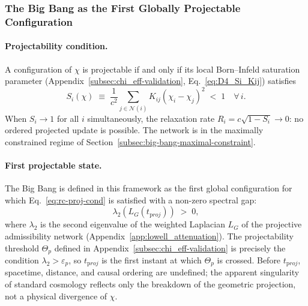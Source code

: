   \subsubsection*{The Big Bang as the First Globally Projectable Configuration}
    \label{sec:relax-cascade-bigbang}

    \paragraph{Projectability condition.}
      A configuration of $\chi$ is projectable if and only if its local Born--Infeld saturation parameter
      (Appendix~\ref{subsec:chi_eff-validation}, Eq.~\eqref{eq:D4_Si_Kij})
      satisfies
    \begin{equation}
      \label{eq:rc-proj-cond}
      S_i(\chi) \;\equiv\;
      \frac{1}{c^2}\sum_{j \in \mathcal{N}(i)} K_{ij}(\chi_i - \chi_j)^2
      \;<\; 1
      \quad \forall\, i.
      \end{equation}
      When $S_i \to 1$ for all $i$ simultaneously, the relaxation rate
      $R_i = c\sqrt{1-S_i} \to 0$: no ordered projected update is possible.
      The network is in the maximally constrained regime of Section~\ref{subsec:big-bang-maximal-constraint}.

    \paragraph{First projectable state.}
      The Big Bang is defined in this framework as the first global
      configuration for which Eq.~\eqref{eq:rc-proj-cond} is satisfied with
      a non-zero spectral gap:
    \begin{equation}
      \label{eq:rc-firstproj}
      \lambda_2\!\left(L_G(t_{\mathrm proj})\right) \;>\; 0,
      \end{equation}
      where $\lambda_2$ is the second eigenvalue of the weighted Laplacian
      $L_G$ of the projective admissibility network (Appendix~\ref{app:lowell_attenuation}).
      The projectability threshold $\Theta_p$ defined in Appendix~\ref{subsec:chi_eff-validation} is
      precisely the condition $\lambda_2 > \varepsilon_p$, so
      $t_{\mathrm proj}$ is the first instant at which $\Theta_p$ is crossed.
      Before $t_{\mathrm proj}$, spacetime, distance, and causal ordering are
      undefined; the apparent singularity of standard cosmology reflects
      only the breakdown of the geometric projection, not a physical
      divergence of $\chi$.

